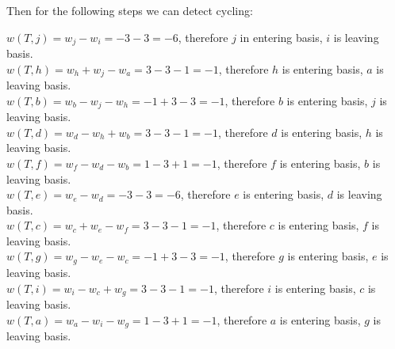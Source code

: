 					Then for the following steps we can detect cycling:

					$w(T, j) = w_j - w_i = -3 -3 = -6$, therefore $j$ in entering basis, $i$ is leaving basis.\\
					$w(T, h) = w_h + w_j - w_a = 3-3-1=-1$, therefore $h$ is entering basis, $a$ is leaving basis.\\
					$w(T, b) = w_b - w_j - w_h = -1 + 3 - 3 = -1$, therefore $b$ is entering basis, $j$ is leaving basis.\\
					$w(T, d) = w_d - w_h + w_b = 3 - 3 - 1 = -1$, therefore $d$ is entering basis, $h$ is leaving basis.\\
					$w(T, f) = w_f - w_d - w_b = 1 - 3 + 1 = -1$, therefore $f$ is entering basis, $b$ is leaving basis.\\
					$w(T, e) = w_e - w_d = -3 -3 = -6$, therefore $e$ is entering basis, $d$ is leaving basis.\\
					$w(T,c) = w_c + w_e - w_f = 3 -3 - 1 = -1$, therefore $c$ is entering basis, $f$ is leaving basis.\\
					$w(T,g) = w_g - w_e - w_c = -1 + 3 - 3 = -1$, therefore $g$ is entering basis, $e$ is leaving basis.\\
					$w(T,i) = w_i - w_c + w_g =3 - 3 - 1= -1 $, therefore $i$ is entering basis, $c$ is leaving basis.\\
					$w(T,a) = w_a - w_i - w_g = 1 - 3 + 1 = -1$, therefore $a$ is entering basis, $g$ is leaving basis.\\

